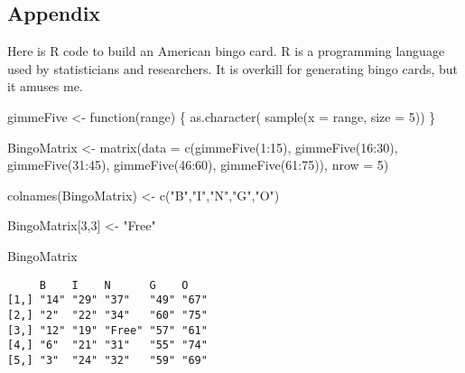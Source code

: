 \documentclass[
  letterpaper,
  DIV=11,
  numbers=noendperiod]{scrartcl}
\newenvironment{Shaded}{\begin{snugshade}}{\end{snugshade}}
\newcommand{\AttributeTok}[1]{\textcolor[rgb]{0.40,0.45,0.13}{#1}}
\newcommand{\ControlFlowTok}[1]{\textcolor[rgb]{0.00,0.23,0.31}{#1}}
\newcommand{\DecValTok}[1]{\textcolor[rgb]{0.68,0.00,0.00}{#1}}
\newcommand{\FunctionTok}[1]{\textcolor[rgb]{0.28,0.35,0.67}{#1}}
\newcommand{\NormalTok}[1]{\textcolor[rgb]{0.00,0.23,0.31}{#1}}
\newcommand{\OtherTok}[1]{\textcolor[rgb]{0.00,0.23,0.31}{#1}}
\newcommand{\SpecialCharTok}[1]{\textcolor[rgb]{0.37,0.37,0.37}{#1}}
\newcommand{\StringTok}[1]{\textcolor[rgb]{0.13,0.47,0.30}{#1}}
\begin{document}
\hypertarget{appendix}{%
\subsection{Appendix}\label{appendix}}

Here is R code to build an American bingo card. R is a programming
language used by statisticians and researchers. It is overkill for
generating bingo cards, but it amuses me.

\begin{Shaded}
\begin{Highlighting}[]
\NormalTok{gimmeFive }\OtherTok{\textless{}{-}} \ControlFlowTok{function}\NormalTok{(range) \{}
  \FunctionTok{as.character}\NormalTok{( }\FunctionTok{sample}\NormalTok{(}\AttributeTok{x =}\NormalTok{ range, }\AttributeTok{size =} \DecValTok{5}\NormalTok{))}
\NormalTok{\}}

\NormalTok{BingoMatrix }\OtherTok{\textless{}{-}} \FunctionTok{matrix}\NormalTok{(}\AttributeTok{data =} \FunctionTok{c}\NormalTok{(}\FunctionTok{gimmeFive}\NormalTok{(}\DecValTok{1}\SpecialCharTok{:}\DecValTok{15}\NormalTok{),}
                               \FunctionTok{gimmeFive}\NormalTok{(}\DecValTok{16}\SpecialCharTok{:}\DecValTok{30}\NormalTok{),}
                               \FunctionTok{gimmeFive}\NormalTok{(}\DecValTok{31}\SpecialCharTok{:}\DecValTok{45}\NormalTok{),}
                               \FunctionTok{gimmeFive}\NormalTok{(}\DecValTok{46}\SpecialCharTok{:}\DecValTok{60}\NormalTok{),}
                               \FunctionTok{gimmeFive}\NormalTok{(}\DecValTok{61}\SpecialCharTok{:}\DecValTok{75}\NormalTok{)),}
                      \AttributeTok{nrow =} \DecValTok{5}\NormalTok{)}

\FunctionTok{colnames}\NormalTok{(BingoMatrix) }\OtherTok{\textless{}{-}} \FunctionTok{c}\NormalTok{(}\StringTok{"B"}\NormalTok{,}\StringTok{"I"}\NormalTok{,}\StringTok{"N"}\NormalTok{,}\StringTok{"G"}\NormalTok{,}\StringTok{"O"}\NormalTok{)}

\NormalTok{BingoMatrix[}\DecValTok{3}\NormalTok{,}\DecValTok{3}\NormalTok{] }\OtherTok{\textless{}{-}} \StringTok{"Free"}

\NormalTok{BingoMatrix}
\end{Highlighting}
\end{Shaded}

\begin{verbatim}
     B    I    N      G    O   
[1,] "14" "29" "37"   "49" "67"
[2,] "2"  "22" "34"   "60" "75"
[3,] "12" "19" "Free" "57" "61"
[4,] "6"  "21" "31"   "55" "74"
[5,] "3"  "24" "32"   "59" "69"
\end{verbatim}
\end{document}
